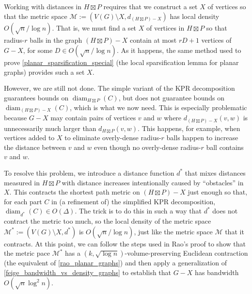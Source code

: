 \documentclass{patmorin}
\DeclareMathOperator{\diam}{diam}
\begin{document}
Working with distances in $H\boxtimes P$ requires that we construct a set $X$ of vertices so that the metric space $\mathcal{M}:=(V(G)\setminus X,d_{(H\boxtimes P)-X})$ has local density $O(\sqrt{n}/\log n)$.  That is, we must find a set $X$  of vertices in $H\boxtimes P$ so that radius-$r$ balls in the graph $(H\boxtimes P)-X$ contain at most $rD+1$ vertices of $G-X$, for some $D\in O(\sqrt{n}/\log n)$.  As it happens, the same method used to prove \cref{planar_sparsification_special} (the local sparsification lemma for planar graphs) provides such a set $X$.

However, we are still not done.  The simple variant of the KPR decomposition guarantees bounds on $\diam_{H\boxtimes P}(C)$, but does not guarantee bounds on $\diam_{(H\boxtimes P)-X}(C)$, which is what we now need.  This is especially problematic because $G-X$ may contain pairs of vertices $v$ and $w$ where $d_{(H\boxtimes P)-X}(v,w)$ is unnecessarily much larger than $d_{H\boxtimes P}(v,w)$.  This happens, for example, when vertices added to $X$ to eliminate overly-dense radius-$r$ balls happen to increase the distance between $v$ and $w$ even though no overly-dense radius-$r$ ball contains $v$ and $w$.

To resolve this problem, we introduce a distance function $d^*$ that mixes distances measured in $H\boxtimes P$ with distance increases intentionally caused by ``obstacles'' in $X$.  This contracts the shortest path metric on $(H\boxtimes P)-X$ just enough so that, for each part $C$ in (a refinement of) the simplified KPR decomposition, $\diam_{d^*}(C)\in O(\Delta)$. The trick is to do this in such a way that $d^*$ does not contract the metric too much, so the local density of the metric space $\mathcal{M}^*:=(V(G)\setminus X,d^*)$ is $O(\sqrt{n}/\log n)$, just like the metric space $\mathcal{M}$ that it contracts.  At this point, we can follow the steps used in Rao's proof to show that the metric pace $\mathcal{M}^*$ has a $(k,\sqrt{\log n})$-volume-preserving Euclidean contraction (the equivalent of \cref{rao_planar_graphs}) and then apply a generalization of \cref{feige_bandwidth_vs_density_graphs} to establish that $G-X$ has bandwidth $O(\sqrt{n}\log^2 n)$.
\end{document}
